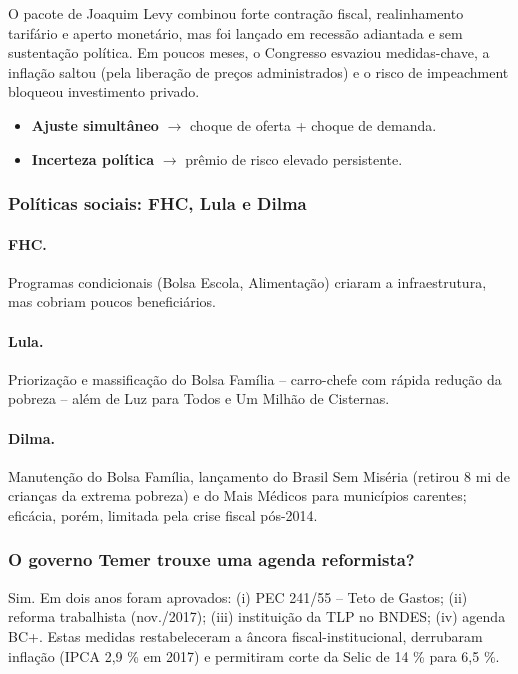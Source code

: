 \documentclass[a4paper,12pt]{article}[abntex2]
\begin{document}
O pacote de Joaquim Levy combinou forte contração fiscal, realinhamento tarifário e aperto monetário, mas foi lançado em recessão adiantada e sem sustentação política. Em poucos meses, o Congresso esvaziou medidas-chave, a inflação saltou (pela liberação de preços administrados) e o risco de impeachment bloqueou investimento privado. 

\begin{itemize}
  \item \textbf{Ajuste simultâneo} $\rightarrow$ choque de oferta + choque de demanda.
  \item \textbf{Incerteza política} $\rightarrow$ prêmio de risco elevado persistente.
\end{itemize}

\subsubsection{\textbf{Políticas sociais: FHC, Lula e Dilma}}

\paragraph{FHC.} Programas condicionais (Bolsa Escola, Alimentação) criaram a infraestrutura, mas cobriam poucos beneficiários. 

\paragraph{Lula.} Priorização e massificação do Bolsa Família – carro-chefe com rápida redução da pobreza – além de Luz para Todos e Um Milhão de Cisternas.   

\paragraph{Dilma.} Manutenção do Bolsa Família, lançamento do Brasil Sem Miséria (retirou 8 mi de crianças da extrema pobreza) e do Mais Médicos para municípios carentes; eficácia, porém, limitada pela crise fiscal pós-2014. 

\subsubsection{\textbf{O governo Temer trouxe uma agenda reformista?}}

Sim. Em dois anos foram aprovados: (i) PEC 241/55 – Teto de Gastos; (ii) reforma trabalhista (nov./2017); (iii) instituição da TLP no BNDES; (iv) agenda BC+. Estas medidas restabeleceram a âncora fiscal-institucional, derrubaram inflação (IPCA 2,9 \% em 2017) e permitiram corte da Selic de 14 \% para 6,5 \%. 
\end{document}
